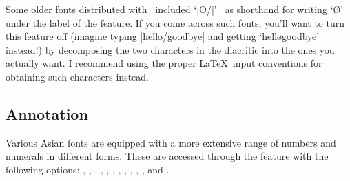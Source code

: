 \documentclass[a4paper]{l3doc}
\begin{document}
Some older fonts distributed with \MacOSX\ included `|O/|' \etc\ as shorthand for writing `\O' under the label of the  feature. If you come across such fonts, you'll
want to turn this feature off (imagine typing |hello/goodbye| and
getting `hell\o goodbye' instead!) by decomposing the two characters
in the diacritic into the ones you actually
want. I recommend using
the proper \LaTeX\ input conventions for obtaining such characters
instead.


\subsection{Annotation}
Various Asian fonts are equipped with a more extensive range of
numbers and numerals in different forms. These are accessed through
the  feature with the following
options: ,
, , , ,
, , , ,
, , and .
\end{document}
